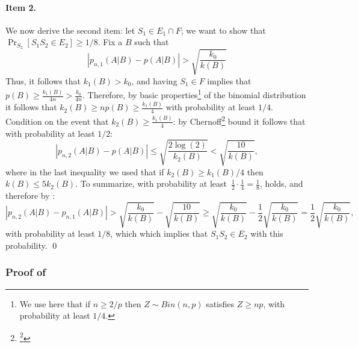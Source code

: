 \documentclass{article}
\newcommand{\Ex}{\mathbb{E}} %
\newcommand{\eps}{\epsilon}
\begin{document}
\paragraph{Item 2.}
We now derive the second item:
let $S_1\in E_1\cap F$; we want to show that $\Pr_{S_2}[S_1S_2\in E_2]\geq 1/8$.
Fix a $B$ such that 
\begin{equation}\label{eq:3}
\left\lvert p_{n,1}(A\vert B) - p(A\vert B) \right\rvert > \sqrt{\frac{k_0}{k(B)}}
\end{equation}
Thus, it follows that $k_1(B) > k_0$, and having $S_1\in F$ implies that $p(B)\geq \frac{k_1(B)}{4n} > \frac{k_0}{4n}$.
Therefore, by basic properties\footnote{We use here that if $n\geq 2/p$ then $Z\sim Bin(n,p)$ satisfies $Z\geq np$,
with probability at least $1/4$.} of the binomial distribution it follows that $k_2(B) \geq np(B)\geq \frac{k_1(B)}{4}$ 
with probability at least $1/4$.
Condition on the event that $k_2(B)\geq \frac{k_1(B)}{4}$: 
by Chernoff\footnote{\footnote{We use here the standard (additive) Chernoff bound:
if $X=\sum_i^n X_i$, where the $X_i$'s are i.i.d 0/1 random variables and $\eps >0$ then $\Pr[\lvert\frac{\sum_iX_i}{n} - \mu\frac \geq \eps]\leq \exp(-2n\eps^2)$, where $\mu=\Ex[X]$.}} bound it follows that
with probability at least $1/2$:
\begin{equation} \label{eq:4}
\left\lvert p_{n,2}(A \vert B) - p(A\vert B) \right\rvert \leq \sqrt{\frac{2\log(2)}{k_2(B)}} < \sqrt{\frac{10}{k(B)}}, 
\end{equation}
where in the last inequality we used that if $k_{2}(B)\geq k_1(B)/4$ then $k(B) \leq 5k_2(B)$.
To summarize, with probability at least~$\frac{1}{2}\cdot\frac{1}{4} = \frac{1}{8}$,  holds,
and therefore by :
\[
\left\lvert p_{n,2}(A \vert B) - p_{n,1}(A\vert B) \right\rvert > 
\sqrt{\frac{k_0}{k(B)}} - \sqrt{\frac{10}{k(B)}}\geq 
\sqrt{\frac{k_0}{k(B)}} - \frac{1}{2}\sqrt{\frac{k_0}{k(B)}}=
\frac{1}{2}\sqrt{\frac{k_0}{k(B)}},
\]
with probability at least $1/8$, which which implies that $S_1S_2\in E_2$ with this probability.
\qed


\subsubsection{Proof of }
\end{document}
